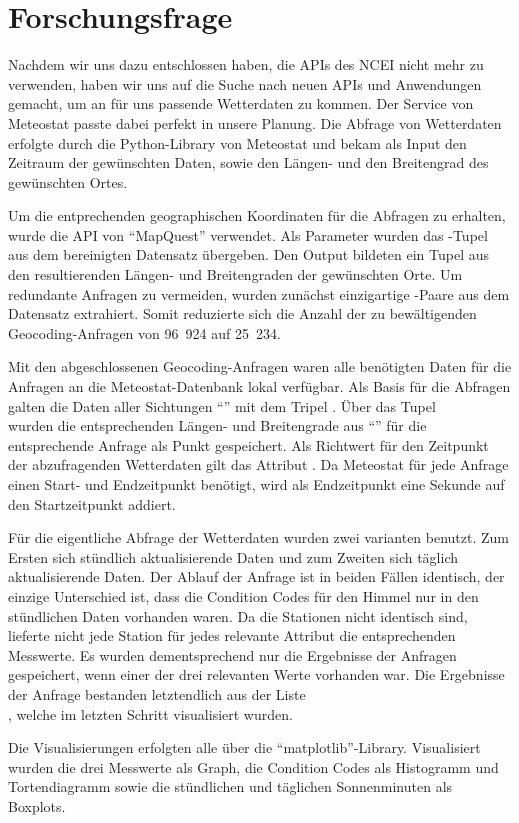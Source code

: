 \section{Forschungsfrage} \label{forschungsfrage}

Nachdem wir uns dazu entschlossen haben, die APIs des NCEI nicht mehr zu verwenden, haben wir uns auf die Suche nach neuen APIs und Anwendungen gemacht, um an für uns passende Wetterdaten zu kommen. Der Service von Meteostat passte dabei perfekt in unsere Planung. Die Abfrage von Wetterdaten erfolgte durch die Python-Library von Meteostat und bekam als Input den Zeitraum der gewünschten Daten, sowie den Längen- und den Breitengrad des gewünschten Ortes.

Um die entprechenden geographischen Koordinaten für die Abfragen zu erhalten, wurde die API von \enquote{MapQuest} verwendet. Als Parameter wurden das -Tupel aus dem bereinigten Datensatz übergeben. Den Output bildeten ein Tupel aus den resultierenden Längen- und Breitengraden der gewünschten Orte. Um redundante Anfragen zu vermeiden, wurden zunächst einzigartige -Paare aus dem Datensatz extrahiert. Somit reduzierte sich die Anzahl der zu bewältigenden Geocoding-Anfragen von 96~924 auf 25~234.

Mit den abgeschlossenen Geocoding-Anfragen waren alle benötigten Daten für die Anfragen an die Meteostat-Datenbank lokal verfügbar. Als Basis für die Abfragen galten die Daten aller Sichtungen \enquote{} mit dem Tripel . Über das Tupel \\ wurden die entsprechenden Längen- und Breitengrade aus \enquote{} für die entsprechende Anfrage als Punkt gespeichert. Als Richtwert für den Zeitpunkt der abzufragenden Wetterdaten gilt das Attribut . Da Meteostat für jede Anfrage einen Start- und Endzeitpunkt benötigt, wird als Endzeitpunkt eine Sekunde auf den Startzeitpunkt addiert.

Für die eigentliche Abfrage der Wetterdaten wurden zwei varianten benutzt. Zum Ersten sich stündlich aktualisierende Daten und zum Zweiten sich täglich aktualisierende Daten. Der Ablauf der Anfrage ist in beiden Fällen identisch, der einzige Unterschied ist, dass die Condition Codes für den Himmel nur in den stündlichen Daten vorhanden waren. Da die Stationen nicht identisch sind, lieferte nicht jede Station für jedes relevante Attribut die entsprechenden Messwerte. Es wurden dementsprechend nur die Ergebnisse der Anfragen gespeichert, wenn einer der drei relevanten Werte vorhanden war. Die Ergebnisse der Anfrage bestanden letztendlich aus der Liste \\, welche im letzten Schritt visualisiert wurden.

Die Visualisierungen erfolgten alle über die \enquote{matplotlib}-Library. Visualisiert wurden die drei Messwerte als Graph, die Condition Codes als Histogramm und Tortendiagramm sowie die stündlichen und täglichen Sonnenminuten als Boxplots.